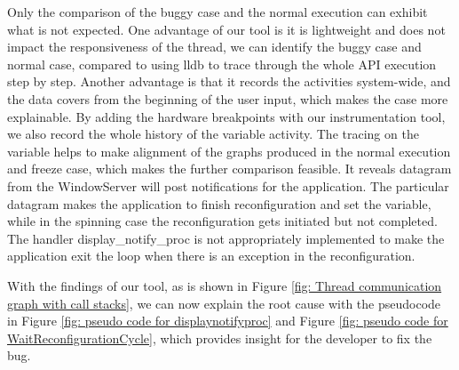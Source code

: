 Only the comparison of the buggy case and the normal execution can exhibit what is not expected.                         
One advantage of our tool is it is lightweight and does not impact the responsiveness of the thread,                     
we can identify the buggy case and normal case,                                                                          
compared to using lldb to trace through the whole API execution step by step.                                            
Another advantage is that it records the activities system-wide,                                                         
and the data covers from the beginning of the user input, which makes the case more explainable.                         
By adding the hardware breakpoints with our instrumentation tool,                                                        
we also record the whole history of the variable activity.                                                               
The tracing on the variable helps to make alignment of the graphs produced in the normal execution and freeze case, which makes the further comparison feasible.
It reveals datagram from the WindowServer will post notifications for the application.                                   
The particular datagram makes the application to finish reconfiguration and set the variable, while in the spinning case the reconfiguration gets initiated but not completed.
The handler display\_notify\_proc is not appropriately implemented to make the application exit the loop when there is an exception in the reconfiguration.

With the findings of our tool, as is shown in Figure \ref{fig: Thread communication graph with call stacks},             
we can now explain the root cause with the pseudocode in Figure \ref{fig: pseudo code for displaynotifyproc} and Figure \ref{fig: pseudo code for WaitReconfigurationCycle},
which provides insight for the developer to fix the bug.
